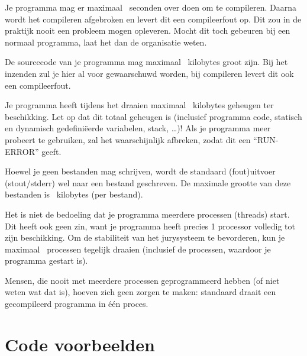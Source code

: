 \documentclass[11pt,titlepage,a4paper]{article}
\begin{document}
\begin{description}
\item[compile-tijd]
Je programma mag er maximaal \COMPILETIME\ seconden over doen om te
compileren. Daarna wordt het compileren afgebroken en levert dit een
compileerfout op. Dit zou in de praktijk nooit een probleem mogen
opleveren. Mocht dit toch gebeuren bij een normaal programma, laat het
dan de organisatie weten.

\item[source grootte]
De sourcecode van je programma mag maximaal \SOURCESIZE\ kilobytes
groot zijn. Bij het inzenden zul je hier al voor gewaarschuwd worden,
bij compileren levert dit ook een compileerfout.

\item[geheugen]
Je programma heeft tijdens het draaien maximaal \MEMLIMIT\ kilobytes
geheugen ter beschikking. Let op dat dit totaal geheugen is (inclusief
programma code, statisch en dynamisch gedefini\"eerde variabelen,
stack, \dots)! Als je programma meer probeert te gebruiken, zal het
waarschijnlijk afbreken, zodat dit een ``RUN-ERROR'' geeft.

\item[bestandsgrootte]
Hoewel je geen bestanden mag schrijven, wordt de standaard (fout)uitvoer
(stout/stderr) wel naar een bestand geschreven. De maximale grootte
van deze bestanden is \FILELIMIT\ kilobytes (per bestand).

\item[aantal processen]
Het is niet de bedoeling dat je programma meerdere processen (threads)
start. Dit heeft ook geen zin, want je programma heeft precies 1
processor volledig tot zijn beschikking. Om de stabiliteit van het
jurysysteem te bevorderen, kun je maximaal \PROCLIMIT\ processen
tegelijk draaien (inclusief de processen, waardoor je programma
gestart is).

Mensen, die nooit met meerdere processen geprogrammeerd hebben (of
niet weten wat dat is), hoeven zich geen zorgen te maken: standaard
draait een gecompileerd programma in \'e\'en proces.

\end{description}


\newpage
\appendix

\section{Code voorbeelden}\label{codevoorbeeld}
\end{document}
